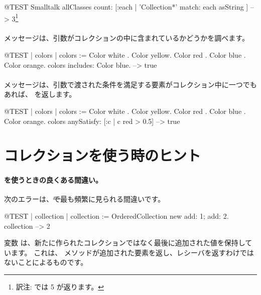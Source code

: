 \documentclass[a4paper,10pt,twoside]{book}
\begin{document}
\begin{code}{@TEST}
Smalltalk allClasses count: [:each | 'Collection*' match: each asString ] --> 3\footnote{訳注:  では 5 が返ります。}
\end{code}

\paragraph{}  メッセージは、引数がコレクションの中に含まれているかどうかを調べます。

\begin{code}{@TEST | colors |}
colors := {Color white . Color yellow. Color red . Color blue . Color orange}.
colors includes: Color blue. --> true
\end{code}

\paragraph{}  メッセージは、引数で渡された条件を満足する要素がコレクション中に一つでもあれば、 を返します。

\begin{code}{@TEST | colors | colors := {Color white . Color yellow. Color red . Color blue . Color orange}.}
colors anySatisfy: [:c | c red > 0.5] --> true
\end{code}
\section{コレクションを使う時のヒント}

\paragraph{ を使うときの良くある間違い。} 次のエラーは、\st で最も頻繁に見られる間違いです。

\begin{code}{@TEST | collection | }
collection := OrderedCollection new add: 1; add: 2.
collection --> 2
\end{code}
\noindent
変数  は、新たに作られたコレクションではなく最後に追加された値を保持しています。
これは、 メソッドが追加された要素を返し、レシーバを返すわけではないことによるものです。
\end{document}
